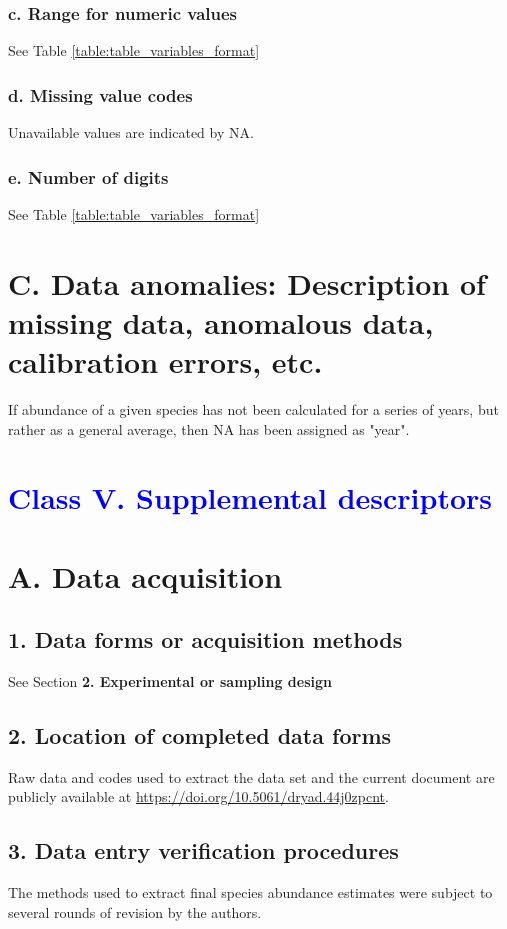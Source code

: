 \documentclass[a4paper,twoside,12pt]{article}
\begin{document}
                    \subsubsection*{c. Range for numeric values} See Table \ref{table:table_variables_format}
                    \subsubsection*{d. Missing value codes} Unavailable values are indicated by NA.
                    \subsubsection*{e. Number of digits} See Table \ref{table:table_variables_format}
            \newpage
            
           
			\newpage
        
 \section*{C. Data anomalies: Description of missing data, anomalous data, calibration errors, etc.}
  If abundance of a given species has not been calculated for a series of years, but rather as a general average, then NA has been assigned as "year".
 
 \section*{\textcolor{Blue}{Class V. Supplemental descriptors}}
    \section*{A. Data acquisition}
    		\subsection*{1. Data forms or acquisition methods}
   		See Section \textbf{2. Experimental or sampling design} 
   		\subsection*{2. Location of completed data forms}
        Raw data and codes used to extract the data set and the current document are publicly available at \url{https://doi.org/10.5061/dryad.44j0zpcnt}.
        \subsection*{3. Data entry verification procedures}
       	The methods used to extract final species abundance estimates were subject to several rounds of revision by the authors.
       	
\end{document}
